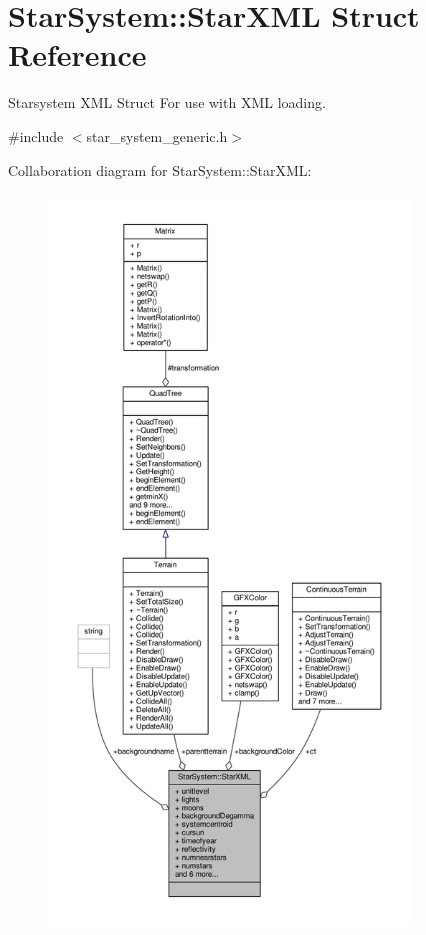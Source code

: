 \hypertarget{structStarSystem_1_1StarXML}{}\section{Star\+System\+:\+:Star\+X\+ML Struct Reference}
\label{structStarSystem_1_1StarXML}


Starsystem X\+ML Struct For use with X\+ML loading.  




{\ttfamily \#include $<$star\+\_\+system\+\_\+generic.\+h$>$}



Collaboration diagram for Star\+System\+:\+:Star\+X\+ML\+:
\nopagebreak
\begin{figure}[H]
\begin{center}
\leavevmode
\includegraphics[height=550pt]{dc/dae/structStarSystem_1_1StarXML__coll__graph}
\end{center}
\end{figure}
